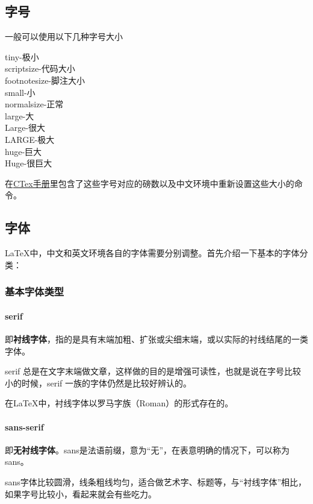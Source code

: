     \subsection{字号}
    一般可以使用以下几种字号大小
    \begin{texbreakshow}
    \tiny{tiny-极小}\\
    \scriptsize{scriptsize-代码大小}\\
    \footnotesize{footnotesize-脚注大小}\\
    \small{small-小}\\
    \normalsize{normalsize-正常}\\ %
    \large{large-大}\\
    \Large{Large-很大}\\
    \LARGE{LARGE-极大}\\
    \huge{huge-巨大}\\
    \Huge{Huge-很巨大}
    \end{texbreakshow}

    在\href{http://mirrors.ibiblio.org/CTAN/language/chinese/ctex/ctex.pdf}{CTex手册}里包含了这些字号对应的磅数以及中文环境中重新设置这些大小的命令。

    \subsection{字体}
    \LaTeX{}中，中文和英文环境各自的字体需要分别调整。首先介绍一下基本的字体分类：
    \subsubsection{基本字体类型}

    \paragraph{serif}
    即\textbf{衬线字体}，指的是具有末端加粗、扩张或尖细末端，或以实际的衬线结尾的一类字体。

    serif 总是在文字末端做文章，这样做的目的是增强可读性，也就是说在字号比较小的时候，serif 一族的字体仍然是比较好辨认的。

    在\LaTeX{}中，衬线字体以罗马字族（Roman）的形式存在的。
    \paragraph{sans-serif}
    即\textbf{无衬线字体}。sans是法语前缀，意为“无”，在表意明确的情况下，可以称为sans。

    sans字体比较圆滑，线条粗线均匀，适合做艺术字、标题等，与“衬线字体”相比，如果字号比较小，看起来就会有些吃力。

